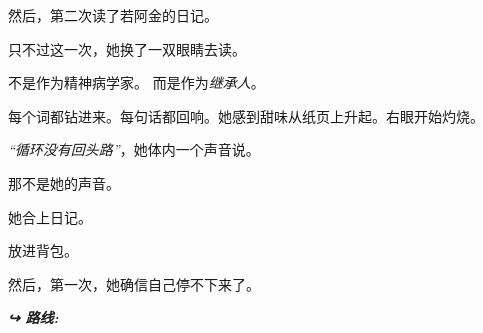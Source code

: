 \noindent 然后，第二次读了若阿金的日记。

\noindent 只不过这一次，她换了一双眼睛去读。

\noindent 不是作为精神病学家。
\noindent 而是作为\textit{继承人}。

\noindent 每个词都钻进来。每句话都回响。她感到甜味从纸页上升起。右眼开始灼烧。

\noindent \textit{\textquotedblleft{}循环没有回头路\textquotedblright{}}，她体内一个声音说。

\noindent 那不是她的声音。

\noindent 她合上日记。

\noindent 放进背包。

\noindent 然后，第一次，她确信自己停不下来了。

\vspace{0.5em}
\noindent\textit{\textbf{↪ 路线:}  \rotasep {}}
